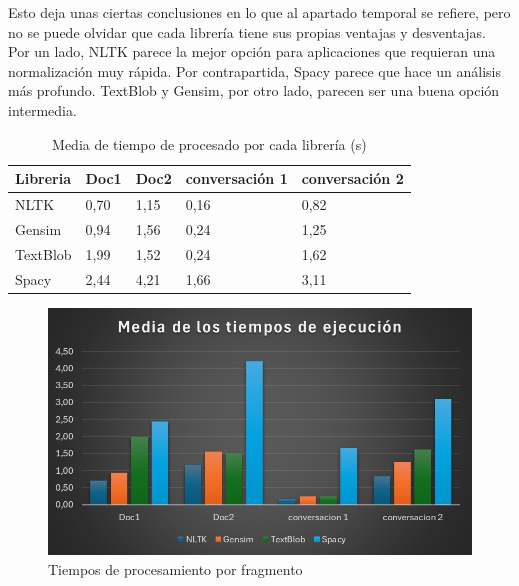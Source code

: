\documentclass[a4paper,twocolumn]{article}
\begin{document}
    Esto deja unas ciertas conclusiones en lo que al apartado temporal se refiere,
    pero no se puede olvidar que cada librería tiene sus propias ventajas y desventajas.
    Por un lado, NLTK parece la mejor opción para aplicaciones que requieran una normalización muy rápida.
    Por contrapartida, Spacy parece que hace un análisis más profundo.
    TextBlob y Gensim, por otro lado, parecen ser una buena opción intermedia.




    \begin{table}
        \begin{adjustbox}{max width=\textwidth/2}
            \centering
            \begin{tabular}{lllll}
                \toprule
                \textbf{Libreria} & \textbf{Doc1} & \textbf{Doc2} & \textbf{conversación 1} & \textbf{conversación 2} \\
                \midrule
                NLTK              & 0,70          & 1,15          & 0,16                    & 0,82                    \\
                Gensim            & 0,94          & 1,56          & 0,24                    & 1,25                    \\
                TextBlob          & 1,99          & 1,52          & 0,24                    & 1,62                    \\
                Spacy             & 2,44          & 4,21          & 1,66                    & 3,11                    \\
                \bottomrule
            \end{tabular}
        \end{adjustbox}
        \caption{Media de tiempo de procesado por cada librería (s)}
        \label{tab:tiempos_procesado}
    \end{table}


    \begin{figure}
        \vspace{1.5pt}
        \centering
        \includegraphics[scale=0.25]{imagenes/grafico_tiempos_procesado}
        \caption{Tiempos de procesamiento por fragmento}
        \label{fig:grafico_tiempos_procesado}
    \end{figure}
\end{document}

